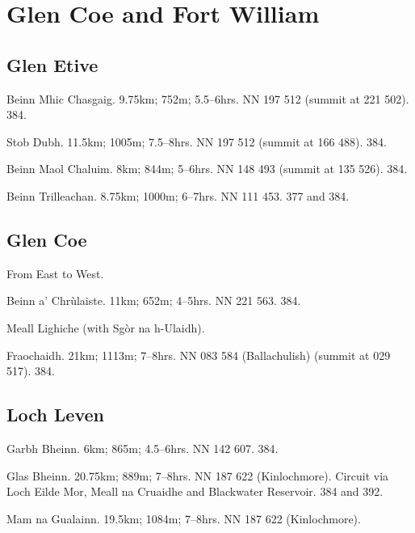 \section{Glen Coe and Fort William}

\subsection{Glen Etive}

\begin{munros}
\item\target Beinn Mhic Chasgaig. 9.75km; 752m; 5.5--6hrs.  NN 197 512 (summit at 221
  502).  384.

\item\target Stob Dubh.  11.5km; 1005m; 7.5--8hrs.   NN 197 512 (summit at 166 488).
  384. 

\item Beinn Maol Chaluim.  8km; 844m; 5--6hrs.  NN 148 493 (summit at 135
  526).  384.

\item Beinn Trilleachan.  8.75km; 1000m; 6--7hrs.  NN 111 453.  377 and 384.
\end{munros}



\subsection{Glen Coe}

From East to West. 

\begin{munros}
\item
Beinn a' Chrùlaiste.  11km; 652m; 4--5hrs. NN 221 563.  384.

\item Meall Lighiche (with Sgòr na h-Ulaidh).  \tick

\item\target Fraochaidh.  21km; 1113m; 7--8hrs.  NN 083 584 (Ballachulish)
  (summit at 029 517).  384.
\end{munros}



\subsection{Loch Leven}

\begin{munros}
\item Garbh Bheinn.  6km; 865m; 4.5--6hrs.  NN 142 607.  384.

\item Glas Bheinn.  20.75km; 889m; 7--8hrs.  NN 187 622 (Kinlochmore).
  Circuit via Loch Eilde Mor, Meall na Cruaidhe and Blackwater Reservoir.  384
  and 392.

\item 
Mam na Gualainn.  19.5km; 1084m; 7--8hrs.  NN 187 622 (Kinlochmore).  
\end{munros}

